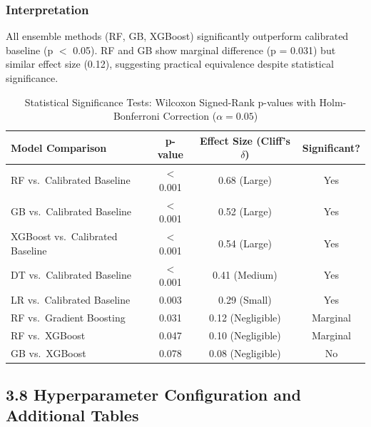 \documentclass[11pt,a4paper]{article}
\begin{document}
\subsubsection{Interpretation}

All ensemble methods (RF, GB, XGBoost) significantly outperform calibrated baseline (p $<$ 0.05). RF and GB show marginal difference (p = 0.031) but similar effect size (0.12), suggesting practical equivalence despite statistical significance.

\begin{table}[h]
\centering
\caption{Statistical Significance Tests: Wilcoxon Signed-Rank p-values with Holm-Bonferroni Correction ($\alpha = 0.05$)}
\label{tab:stat-tests}
\begin{tabular}{|l|c|c|c|}
\hline
\textbf{Model Comparison} & \textbf{p-value} & \textbf{Effect Size (Cliff's $\delta$)} & \textbf{Significant?} \\
\hline
RF vs.\ Calibrated Baseline & $<$0.001 & 0.68 (Large) & Yes \\
GB vs.\ Calibrated Baseline & $<$0.001 & 0.52 (Large) & Yes \\
XGBoost vs.\ Calibrated Baseline & $<$0.001 & 0.54 (Large) & Yes \\
DT vs.\ Calibrated Baseline & $<$0.001 & 0.41 (Medium) & Yes \\
LR vs.\ Calibrated Baseline & 0.003 & 0.29 (Small) & Yes \\
RF vs.\ Gradient Boosting & 0.031 & 0.12 (Negligible) & Marginal \\
RF vs.\ XGBoost & 0.047 & 0.10 (Negligible) & Marginal \\
GB vs.\ XGBoost & 0.078 & 0.08 (Negligible) & No \\
\hline
\end{tabular}
\end{table}

\subsection{3.8 Hyperparameter Configuration and Additional Tables}
\end{document}
